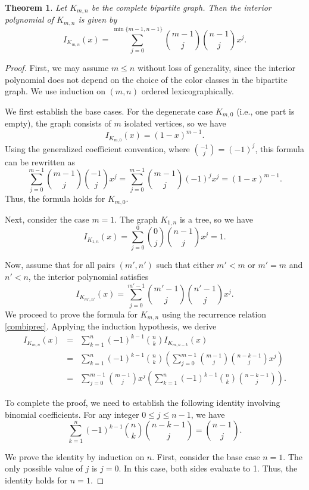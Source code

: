 \documentclass{amsart}
\newtheorem{theorem}{Theorem}[section]
\theoremstyle{definition}
\theoremstyle{remark}
\numberwithin{equation}{section}
\begin{document}
\begin{theorem}\label{thm:complete}
Let $K_{m,n}$ be the complete bipartite graph. Then the interior polynomial of $K_{m,n}$ is given by
\[
I_{K_{m,n}}(x)=\sum_{j=0}^{\min\{m-1,n-1\}}\binom{m-1}{j}\binom{n-1}{j}x^j.
\]
\end{theorem}

\begin{proof}
First, we may assume $m \le n$ without loss of generality, since the interior polynomial does not depend on the choice of the color classes in the bipartite graph. We use induction on $(m,n)$ ordered lexicographically.

We first establish the base cases.  
For the degenerate case $K_{m,0}$ (i.e., one part is empty), the graph consists of $m$ isolated vertices, so we have
\[
I_{K_{m,0}}(x)=(1-x)^{m-1}.
\]
Using the generalized coefficient convention, where $\binom{-1}{j}=(-1)^j$, this formula can be rewritten as
\[
\sum_{j=0}^{m-1}\binom{m-1}{j}\binom{-1}{j}x^j=\sum_{j=0}^{m-1}\binom{m-1}{j}(-1)^j x^j=(1-x)^{m-1}.
\]
Thus, the formula holds for $K_{m,0}$.

Next, consider the case $m=1$. The graph $K_{1,n}$ is a tree, so we have
\[
I_{K_{1,n}}(x)=\sum_{j=0}^{0}\binom{0}{j}\binom{n-1}{j}x^j=1.
\]

Now, assume that for all pairs $(m',n')$ such that either $m'<m$ or $m'=m$ and $n'<n$, the interior polynomial satisfies
\[
I_{K_{m',n'}}(x)=\sum_{j=0}^{m'-1}\binom{m'-1}{j}\binom{n'-1}{j}x^j.
\]
We proceed to prove the formula for $K_{m,n}$ using the recurrence relation \eqref{combiprec}. Applying the induction hypothesis, we derive
\begin{eqnarray*}
I_{K_{m,n}}(x) &=& \sum_{k=1}^{n} (-1)^{k-1} \binom{n}{k} I_{K_{m,n-k}}(x)\\
&=&\sum_{k=1}^{n}(-1)^{k-1}\binom{n}{k}\left(\sum_{j=0}^{m-1}\binom{m-1}{j}\binom{n-k-1}{j}x^j\right)\\
&=&\sum_{j=0}^{m-1}\binom{m-1}{j}x^j\left(\sum_{k=1}^{n}(-1)^{k-1}\binom{n}{k}\binom{n-k-1}{j}\right).
\end{eqnarray*}

To complete the proof, we need to establish the following identity involving binomial coefficients. For any integer $0 \le j \le n-1$, we have
\begin{equation}\label{eq:binom_identity}
\sum_{k=1}^{n}(-1)^{k-1}\binom{n}{k}\binom{n-k-1}{j}=\binom{n-1}{j}.
\end{equation}

We prove the identity by induction on $n$. First, consider the base case $n=1$. The only possible value of $j$ is $j=0$. In this case, both sides evaluate to 1. Thus, the identity holds for $n=1$.


\end{proof}
\end{document}
